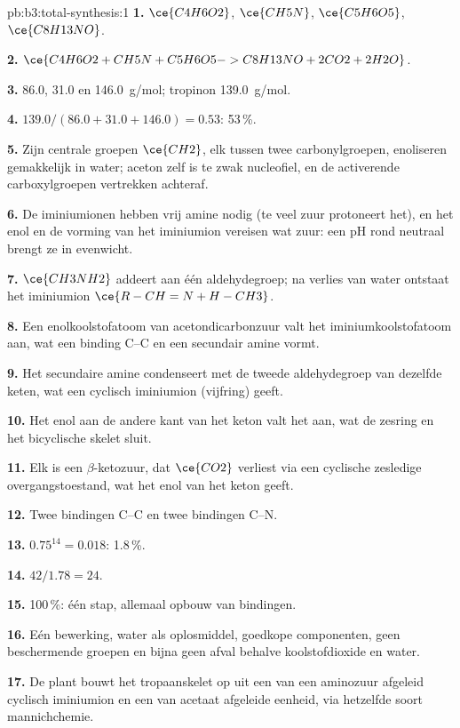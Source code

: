 \begin{solution}{pb:b3:total-synthesis:1}
\textbf{1.} $\ce{C4H6O2}$, $\ce{CH5N}$, $\ce{C5H6O5}$, $\ce{C8H13NO}$.

\textbf{2.} $\ce{C4H6O2 + CH5N + C5H6O5 -> C8H13NO + 2CO2 + 2H2O}$.

\textbf{3.} 86.0, 31.0 en \qty{146.0}{g/mol}; tropinon \qty{139.0}{g/mol}.

\textbf{4.} $139.0/(86.0 + 31.0 + 146.0) = 0.53$: 53\,\%.

\textbf{5.} Zijn centrale groepen $\ce{CH2}$, elk tussen twee carbonylgroepen, enoliseren gemakkelijk in
water; aceton zelf is te zwak nucleofiel, en de activerende
carboxylgroepen vertrekken achteraf.

\textbf{6.} De iminiumionen hebben vrij amine nodig (te veel zuur
protoneert het), en het enol en de vorming van het iminiumion vereisen
wat zuur: een pH rond neutraal brengt ze in evenwicht.

\textbf{7.} $\ce{CH3NH2}$ addeert aan één aldehydegroep; na verlies van water
ontstaat het iminiumion
$\ce{R-CH=N+H-CH3}$.

\textbf{8.} Een enolkoolstofatoom van acetondicarbonzuur valt het
iminiumkoolstofatoom aan, wat een binding C--C en een secundair amine
vormt.

\textbf{9.} Het secundaire amine condenseert met de tweede aldehydegroep
van dezelfde keten, wat een cyclisch iminiumion (vijfring) geeft.

\textbf{10.} Het enol aan de andere kant van het keton valt het aan, wat
de zesring en het bicyclische skelet sluit.

\textbf{11.} Elk is een $\beta$-ketozuur, dat $\ce{CO2}$ verliest via een cyclische zesledige
overgangstoestand, wat het enol van het keton geeft.

\textbf{12.} Twee bindingen C--C en twee bindingen C--N.

\textbf{13.} $0.75^{14} = 0.018$: 1.8\,\%.

\textbf{14.} $42/1.78 = 24$.

\textbf{15.} 100\,\%: één stap, allemaal opbouw van bindingen.

\textbf{16.} Eén bewerking, water als oplosmiddel, goedkope componenten,
geen beschermende groepen en bijna geen afval behalve koolstofdioxide en
water.

\textbf{17.} De plant bouwt het tropaanskelet op uit een van een aminozuur
afgeleid cyclisch iminiumion en een van acetaat afgeleide eenheid, via
hetzelfde soort mannichchemie.


\end{solution}

